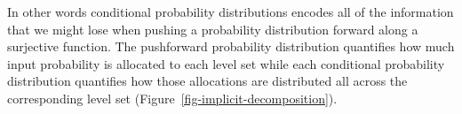\documentclass[
  letterpaper,
  DIV=11,
  numbers=noendperiod]{scrartcl}
\begin{document}
In other words conditional probability distributions encodes all of the
information that we might lose when pushing a probability distribution
forward along a surjective function. The pushforward probability
distribution quantifies how much input probability is allocated to each
level set while each conditional probability distribution quantifies how
those allocations are distributed all across the corresponding level set
(Figure~\ref{fig-implicit-decomposition}).

\begin{figure}

\begin{minipage}{0.66\linewidth}


\subcaption{\label{fig-decomposition-function}}

\end{minipage}%
%
\begin{minipage}{0.34\linewidth}

\end{minipage}
\end{figure}
\end{document}
